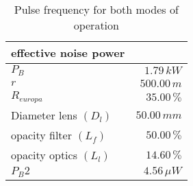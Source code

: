 \begin{table}[H]
\centering
\caption{Pulse frequency for both modes of operation}
\label{tab:effective_noise_power}
\begin{tabular}{|l|r|}\hline
    \textbf{effective noise power} & \\
    \hline 
    $P_B$ & $1.79\,k W$ \\
    $r$ & $500.00\, m$ \\
    $R_{europa}$ & $35.00\, \%$ \\
    Diameter lens $(D_l)$ & $50.00\,m m$ \\
    opacity filter $(L_f)$ & $50.00\, \%$ \\
    opacity optics $(L_l)$ & $14.60\, \%$ \\
    $P_B2$ & $4.56\,\mu W$ \\
    \hline 
\end{tabular}
\end{table}
